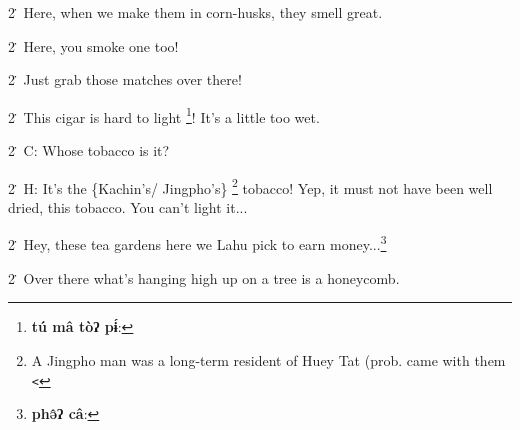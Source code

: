 2\. Here, when we make them in corn-husks, they smell great.

2\. Here, you smoke one too!

2\. Just grab those matches over there!

2\. This cigar is hard to light \footnote{\textbf{tú mâ tòʔ  pɨ́}:}! It's a little too wet.

2\. C: Whose tobacco is it?

2\. H: It's the \{Kachin's/ Jingpho's\} \footnote{A Jingpho man was a long-term resident of Huey Tat (prob. came with them \texttt{<}} tobacco! Yep, it must not have been
well dried, this tobacco. You can't light it...

2\. Hey, these tea gardens here we Lahu pick to earn money...\footnote{\textbf{phə̂ʔ câ}:}

2\. Over there what's hanging high up on a tree is a honeycomb.

